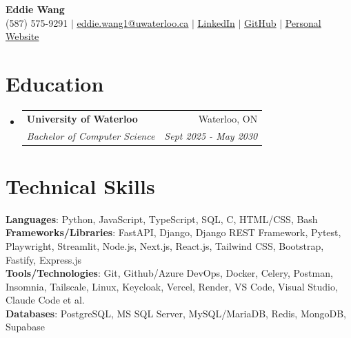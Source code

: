 \documentclass[letterpaper,11pt]{article}
\makeatletter
\newcommand{\resumeSubheading}[4]{
  \vspace{-2pt}\item
    \begin{tabular*}{0.97\textwidth}[t]{l@{\extracolsep{\fill}}r}
      \textbf{#1} & #2 \\
      \textit{\small#3} & \textit{\small #4} \\
    \end{tabular*}\vspace{-7pt}
}
\newcommand{\resumeSubHeadingListStart}{\begin{itemize}[leftmargin=0.15in, label={}]}
\newcommand{\resumeSubHeadingListEnd}{\end{itemize}}
\makeatother
\begin{document}
\begin{center}
    \textbf{\Huge Eddie Wang} \\ \vspace{1pt}
    \small (587) 575-9291 $|$ \href{mailto:eddie.wang1@uwaterloo.ca}{\underline{eddie.wang1@uwaterloo.ca}} $|$
    \href{https://www.linkedin.com/in/eddie-p-wang/}{\underline{LinkedIn}} $|$
    \href{https://github.com/Syzygicality}{\underline{GitHub}} $|$
    \href{https://www.edisonwang.dev/}{\underline{Personal Website}}\end{center}

\section{Education}
  \resumeSubHeadingListStart
\resumeSubheading
      {University of Waterloo}{Waterloo, ON}
      {Bachelor of Computer Science}{Sept 2025 - May 2030}
\resumeSubHeadingListEnd
\section{Technical Skills}
  \begin{itemize}[leftmargin=0.15in, label={}]
    \small{\item{
\textbf{Languages}{: Python, JavaScript, TypeScript, SQL, C, HTML/CSS, Bash} \\
\textbf{Frameworks/Libraries}{: FastAPI, Django, Django REST Framework, Pytest, Playwright, Streamlit, Node.js, Next.js, React.js, Tailwind CSS, Bootstrap, Fastify, Express.js} \\
\textbf{Tools/Technologies}{: Git, Github/Azure DevOps, Docker, Celery, Postman, Insomnia, Tailscale, Linux, Keycloak, Vercel, Render, VS Code, Visual Studio, Claude Code et al.} \\
\textbf{Databases}{: PostgreSQL, MS SQL Server, MySQL/MariaDB, Redis, MongoDB, Supabase} \\
}}
  \end{itemize}%
\end{document}

